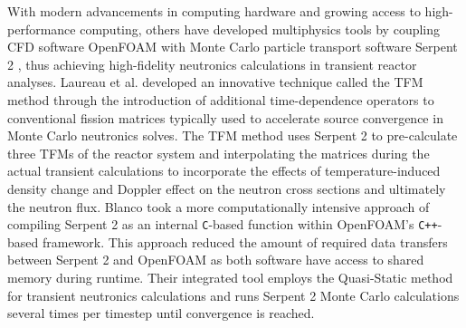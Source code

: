 With modern
advancements in computing hardware and growing access to high-performance
computing, others \citep{laureau_transient_2017,blanco_neutronic_2020} have
developed multiphysics tools by coupling \gls{CFD} software OpenFOAM
\cite{openfoam_openfoam_2021} with Monte Carlo particle transport software
Serpent 2 \cite{leppanen_serpent_2014}, thus achieving high-fidelity neutronics
calculations in transient reactor analyses. Laureau et al.
\cite{laureau_transient_2017} developed an innovative technique called the
\gls{TFM} method through the introduction of additional time-dependence
operators to conventional fission matrices typically used to accelerate source
convergence in Monte Carlo neutronics solves. The \gls{TFM} method
uses Serpent 2 to pre-calculate three \glspl{TFM} of the reactor system and
interpolating the matrices during the actual transient calculations to
incorporate the effects of temperature-induced density change and Doppler
effect on the neutron cross sections and ultimately the neutron flux. Blanco
\cite{blanco_neutronic_2020} took a more computationally intensive approach of
compiling Serpent 2 as an internal \texttt{C}-based function within OpenFOAM's
\texttt{C++}-based framework. This approach reduced the amount of required data
transfers between Serpent 2 and OpenFOAM as both software have access to shared
memory during runtime. Their integrated tool employs the Quasi-Static
method for transient neutronics calculations and runs Serpent 2 Monte Carlo
calculations several times per timestep until convergence is reached.


